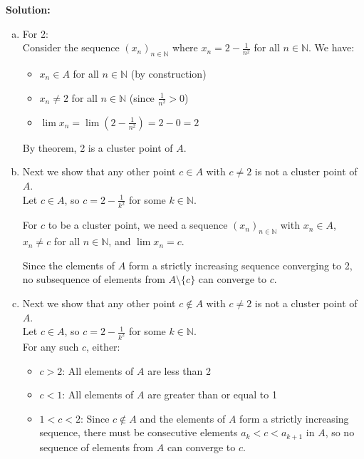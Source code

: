 \documentclass{article}
\begin{document}
\textbf{Solution: } \\

\begin{enumerate}[(a)]
    \item For 2: \\
    Consider the sequence $(x_n)_{n\in\mathbb{N}}$ where $x_n = 2 - \frac{1}{n^2}$ for all $n \in \mathbb{N}$.
    We have:
    \begin{itemize}
        \item $x_n \in A$ for all $n \in \mathbb{N}$ (by construction)
        \item $x_n \neq 2$ for all $n \in \mathbb{N}$ (since $\frac{1}{n^2} > 0$)
        \item $\lim x_n = \lim (2 - \frac{1}{n^2}) = 2 - 0 = 2$
    \end{itemize}

    By theorem, 2 is a cluster point of $A$.

    \item Next we show that any other point $c \in A$ with $c \neq 2$ is not a cluster point of $A$. \\
    
    Let $c \in A$, so $c = 2 - \frac{1}{k^2}$ for some $k \in \mathbb{N}$.

    For $c$ to be a cluster point, we need a sequence $(x_n)_{n\in\mathbb{N}}$ with $x_n \in A$, $x_n \neq c$ for all $n \in \mathbb{N}$, and $\lim x_n = c$.

    Since the elements of $A$ form a strictly increasing sequence converging to 2, no subsequence of elements from $A \setminus \{c\}$ can converge to $c$.

    \item Next we show that any other point $c \notin A$ with $c \neq 2$ is not a cluster point of $A$. \\

    Let $c \in A$, so $c = 2 - \frac{1}{k^2}$ for some $k \in \mathbb{N}$. \\

    For any such $c$, either:
    \begin{itemize}
        \item $c > 2$: All elements of $A$ are less than 2
        \item $c < 1$: All elements of $A$ are greater than or equal to 1
        \item $1 < c < 2$: Since $c \notin A$ and the elements of $A$ form a strictly increasing sequence, there must be consecutive elements $a_k < c < a_{k+1}$ in $A$, so no sequence of elements from $A$ can converge to $c$.
    \end{itemize}
\end{enumerate}
\end{document}
